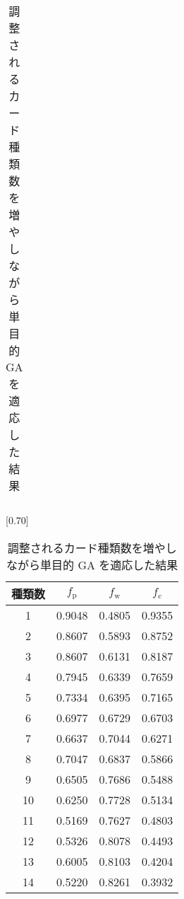 \documentclass[twocolumn]{jarticle}     %
\begin{document}
\begin{table}[t]
\begin{minipage}{0.50\hsize}
{\begin{tabular}{|cc|cc|}
             \end{tabular}
         }
         \end{minipage}%
         \begin{minipage}{0.50\hsize}
           \centering
           \caption{調整されるカード種類数を増やしながら単目的 GA を適応した結果}
            \label{jikken3result}
            \vspace{-0.3cm}
           \scalebox{0.70}[0.70]{
                   \begin{tabular}{|c|c|c|c|}
                     \hline
                     種類数     & $f_\mathrm{p}$ & $f_\mathrm{w}$ & $f_\mathrm{c}$\\ \hline \hline
                     1              & 0.9048         & 0.4805 & 0.9355  \\ \hline
                     2           & 0.8607         & 0.5893 & 0.8752 \\ \hline
                     3        & 0.8607         & 0.6131 & 0.8187  \\ \hline
                     4    & 0.7945         & 0.6339 & 0.7659 \\ \hline
                     5 & 0.7334         & 0.6395  & 0.7165 \\ \hline
                     6 & 0.6977      & 0.6729  & 0.6703 \\ \hline
                     7& 0.6637   & 0.7044  & 0.6271 \\ \hline
                     8 & 0.7047 & 0.6837 & 0.5866 \\ \hline
                     9 & 0.6505 & 0.7686 & 0.5488\\ \hline
                     10 & 0.6250 & 0.7728  & 0.5134\\ \hline
                     11 & 0.5169 & 0.7627 & 0.4803\\ \hline
                     12 & 0.5326 & 0.8078 & 0.4493\\ \hline
                     13 & 0.6005 & 0.8103 & 0.4204\\ \hline
                     14 &  0.5220 &  0.8261 & 0.3932\\ \hline
                     \end{tabular}
                 }
         \end{minipage}
       \end{table}
     
\end{document}
